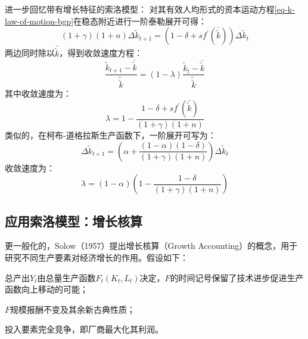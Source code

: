 进一步回忆带有增长特征的索洛模型：
对其有效人均形式的资本运动方程\cref{eq-k-law-of-motion-bgp}在稳态附近进行一阶泰勒展开可得：
\begin{equation}
    (1+\gamma)(1+n) \Delta \tilde{k}_{t+1}
        = \left(1-\delta+s f^{\prime}(\overline{\tilde{k}})\right) \Delta \tilde{k}_t
\end{equation}
两边同时除以$\bar{\tilde{k}}$，得到收敛速度方程：
\begin{equation*}
    \frac{\tilde{k}_{t+1}-\bar{\tilde{k}}}{\tilde{\tilde{k}}}
        = (1-\lambda) \frac{\tilde{k}_t-\bar{\tilde{k}}}{\tilde{\tilde{k}}}
\end{equation*}
其中收敛速度为：
\begin{equation*}
    \lambda=1-\frac{1-\delta+s f^{\prime}(\bar{\tilde{k}})}{(1+\gamma)(1+n)} 
\end{equation*}
类似的，在柯布-道格拉斯生产函数下，一阶展开可写为：
\begin{equation*}
    \Delta \tilde{k}_{t+1}
        = \left(\alpha+\frac{(1-\alpha)(1-\delta)}{(1+\gamma)(1+n)}\right) \Delta \tilde{k}_t
\end{equation*}
收敛速度为：
\begin{equation*}
    \lambda = (1-\alpha)\left(1-\frac{1-\delta}{(1+\gamma)(1+n)}\right)
\end{equation*}


\subsection{应用索洛模型：增长核算}

更一般化的，Solow（1957）提出增长核算（Growth Accounting）的概念，用于研究不同生产要素对经济增长的作用。假设如下：
\begin{assumption}
    总产出$Y_t$由总量生产函数$F_t\left(K_t,L_t\right)$决定，$F$的时间记号保留了技术进步促进生产函数向上移动的可能；
\end{assumption}
\begin{assumption}
    $F$规模报酬不变及其余新古典性质；
\end{assumption}
\begin{assumption}
    投入要素完全竞争，即厂商最大化其利润。
\end{assumption}

